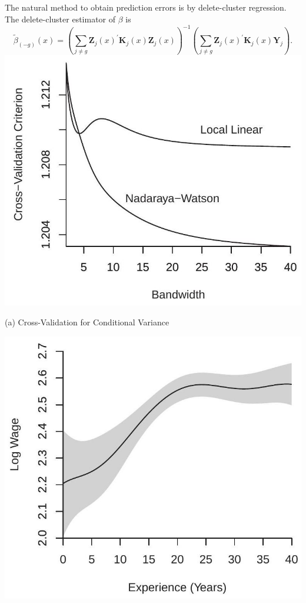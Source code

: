 \documentclass[10pt]{article}
\begin{document}
The natural method to obtain prediction errors is by delete-cluster regression. The delete-cluster estimator of $\beta$ is
$$
\widetilde{\beta}_{(-g)}(x)=\left(\sum_{j \neq g} \boldsymbol{Z}_{j}(x)^{\prime} \boldsymbol{K}_{j}(x) \boldsymbol{Z}_{j}(x)\right)^{-1}\left(\sum_{j \neq g} \boldsymbol{Z}_{j}(x)^{\prime} \boldsymbol{K}_{j}(x) \boldsymbol{Y}_{j}\right) .
$$
\includegraphics[max width=\textwidth]{2022_10_23_027876b875523fa3ea56g-24}

(a) Cross-Validation for Conditional Variance

\includegraphics[max width=\textwidth]{2022_10_23_027876b875523fa3ea56g-24(1)}
\end{document}
